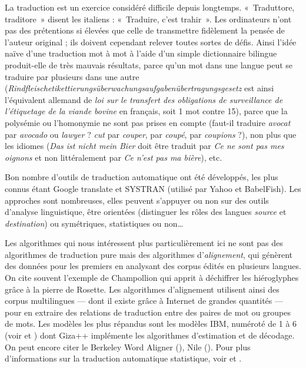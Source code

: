 \documentclass[a4paper,10pt]{article}
\newcommand{\guill}[1]{«~#1~»}
\begin{document}
La traduction est un exercice considéré difficile depuis longtemps. \guill{Traduttore, traditore} di\-sent les italiens : \guill{Traduire, c'est trahir}. Les ordinateurs n'ont pas des prétentions si élevées que celle de transmettre fidèlement la pensée de l'auteur original ; ils doivent cependant relever toutes sortes de défis. Ainsi l'idée naïve d'une traduction mot à mot à l'aide d'un simple dictionnaire bilingue produit-elle de très mauvais résultats, parce qu'un mot dans une langue peut se traduire par plusieurs dans une autre (\emph{Rindfleischetikettierungsüberwachungsaufgabenübertragungsgesetz} est ainsi l'équivalent allemand de \emph{loi sur le transfert des obligations de surveillance de l'étiquetage de la viande bovine} en français, soit 1 mot contre 15), parce que la polysémie ou l'homonymie ne sont pas prises en compte (faut-il traduire \emph{avocat} par \emph{avocado} ou \emph{lawyer} ? \emph{cut} par \emph{couper}, par \emph{coupé}, par \emph{coupions} ?), non plus que les idiomes (\emph{Das ist nicht mein Bier} doit être traduit par \emph{Ce ne sont pas mes oignons} et non littéralement par \emph{Ce n'est pas ma bière}), etc.

Bon nombre d'outils de traduction automatique ont été développés, les plus connus étant Google translate et SYSTRAN (utilisé par Yahoo et BabelFish). Les approches sont nombreuses, elles peuvent s'appuyer ou non sur des outils d'analyse linguistique, être orientées (distinguer les rôles des langues \emph{source} et \emph{destination}) ou symétriques, statistiques ou non\dots

Les algorithmes qui nous intéressent plus particulièrement ici ne sont pas des algorithmes de traduction pure mais des algorithmes d'\emph{alignement}, qui génèrent des données pour les premiers en analysant des corpus édités en plusieurs langues. On cite souvent l'exemple de Champollion qui apprit à déchiffrer les hiéroglyphes grâce à la pierre de Rosette. Les algorithmes d'alignement utilisent ainsi des corpus multilingues --- dont il existe grâce à Internet de grandes quantités --- pour en extraire des relations de traduction entre des paires de mot ou groupes de mots. Les modèles les plus répandus sont les modèles IBM, numéroté de 1 à 6 (voir \cite{vogel1996hmm} et \cite{och2003systematic}) dont Giza++ \cite{och2003giza++} implémente les algorithmes d'estimation et de décodage. On peut encore citer le Berkeley Word Aligner (\cite{berkeleywordaligner}), Nile (\cite{nilewordaligner}). Pour plus d'informations sur la traduction automatique statistique, voir \cite{Brown:1990:SAM:92858.92860} et \cite{gaussier2011modeles}.
\end{document}
